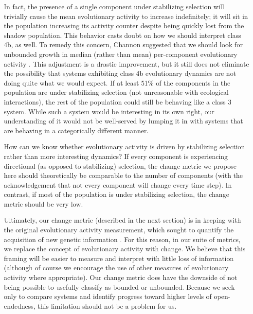 \documentclass[letterpaper]{article}
\begin{document}
In fact, the presence of a single component under stabilizing selection will trivially cause the mean evolutionary activity to increase indefinitely; it will sit in the population increasing its activity counter despite being quickly lost from the shadow population. This behavior casts doubt on how we should interpret class 4b, as well. To remedy this concern, Channon suggested that we should look for unbounded growth in median (rather than mean) per-component evolutionary activity \citep{channon_improving_2003}. This adjustment is a drastic improvement, but it still does not eliminate the possibility that systems exhibiting class 4b evolutionary dynamics are not doing quite what we would expect. If at least 51\% of the components in the population are under stabilizing selection (not unreasonable with ecological interactions), the rest of the population could still be behaving like a class 3 system. While such a system would be interesting in its own right, our understanding of it would not be well-served by lumping it in with systems that are behaving in a categorically different manner.

How can we know whether evolutionary activity is driven by stabilizing selection rather than more interesting dynamics? If every component is experiencing directional (as opposed to stabilizing) selection, the change metric we propose here should theoretically be comparable to the number of components (with the acknowledgement that not every component will change every time step). In contrast, if most of the population is under stabilizing selection, the change metric should be very low.

Ultimately, our change metric (described in the next section) is in keeping with the original evolutionary activity measurement, which sought to quantify the acquisition of new genetic information \citep{langton_measurement_1992}. For this reason, in our suite of metrics, we replace the concept of evolutionary activity with change. We believe that this framing will be easier to measure and interpret with little loss of information (although of course we encourage the use of other measures of evolutionary activity where appropriate). Our change metric does have the downside of not being possible to usefully classify as bounded or unbounded. Because we seek only to compare systems and identify progress toward higher levels of open-endedness, this limitation should not be a problem for us.

\end{document}
